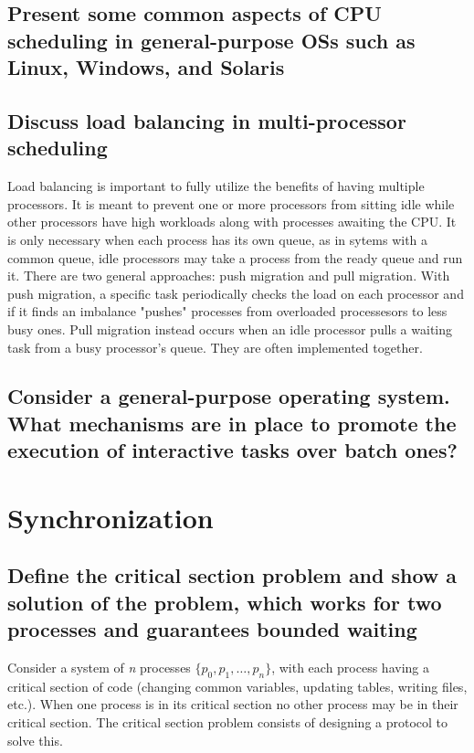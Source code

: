 \documentclass{article}
\begin{document}
\subsection{Present some common aspects of CPU scheduling in general-purpose OSs such as Linux, Windows, and Solaris}

\subsection{Discuss load balancing in multi-processor scheduling}
Load balancing is important to fully utilize the benefits of having multiple processors. It is meant to prevent one or more processors from sitting idle while other processors have high workloads along with processes awaiting the CPU. It is only necessary when each process has its own queue, as in sytems with a common queue, idle processors may take a process from the ready queue and run it. There are two general approaches: push migration and pull migration. With push migration, a specific task periodically checks the load on each processor and if it finds an imbalance "pushes" processes from overloaded processesors to less busy ones. Pull migration instead occurs when an idle processor pulls a waiting task from a busy processor's queue. They are often implemented together.

\subsection{Consider a general-purpose operating system. What mechanisms are in place to promote the execution of interactive tasks over batch ones?}

\section{Synchronization}

\subsection{Define the critical section problem and show a solution of the problem, which works for two processes and guarantees bounded waiting}
Consider a system of \emph{n} processes $\{p_0,p_1,\dots,p_n\}$, with each process having a critical section of code (changing common variables, updating tables, writing files, etc.). When one process is in its critical section no other process may be in their critical section. The critical section problem consists of designing a protocol to solve this.
\end{document}
